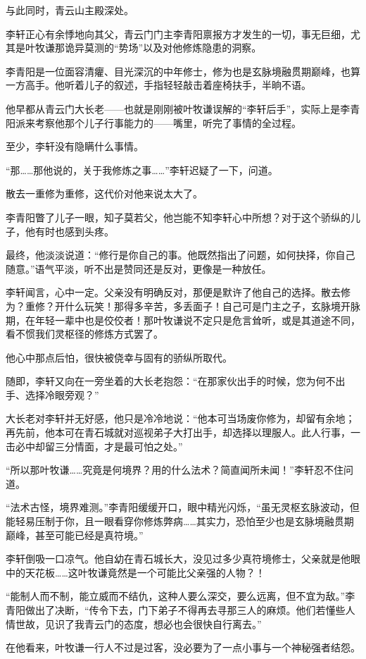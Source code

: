 与此同时，青云山主殿深处。

李轩正心有余悸地向其父，青云门门主李青阳禀报方才发生的一切，事无巨细，尤其是叶牧谦那诡异莫测的“势场”以及对他修炼隐患的洞察。

李青阳是一位面容清癯、目光深沉的中年修士，修为也是玄脉境融贯期巅峰，也算一方高手。他听着儿子的叙述，手指轻轻敲击着座椅扶手，半晌不语。

他早都从青云门大长老——也就是刚刚被叶牧谦误解的“李轩后手”，实际上是李青阳派来考察他那个儿子行事能力的——嘴里，听完了事情的全过程。

至少，李轩没有隐瞒什么事情。

“那……那他说的，关于我修炼之事……”李轩迟疑了一下，问道。

散去一重修为重修，这代价对他来说太大了。

李青阳瞥了儿子一眼，知子莫若父，他岂能不知李轩心中所想？对于这个骄纵的儿子，他有时也感到头疼。

最终，他淡淡说道：“修行是你自己的事。他既然指出了问题，如何抉择，你自己随意。”语气平淡，听不出是赞同还是反对，更像是一种放任。

李轩闻言，心中一定。父亲没有明确反对，那便是默许了他自己的选择。散去修为？重修？开什么玩笑！那得多辛苦，多丢面子！自己可是门主之子，玄脉境开脉期，在年轻一辈中也是佼佼者！那叶牧谦说不定只是危言耸听，或是其道途不同，看不惯我们灵枢径的修炼方式罢了。

他心中那点后怕，很快被侥幸与固有的骄纵所取代。

随即，李轩又向在一旁坐着的大长老抱怨：“在那家伙出手的时候，您为何不出手、选择冷眼旁观？”

大长老对李轩并无好感，他只是冷冷地说：“他本可当场废你修为，却留有余地；再先前，他本可在青石城就对巡视弟子大打出手，却选择以理服人。此人行事，一击必中却留三分情面，才是最可怕之处。”

“所以那叶牧谦……究竟是何境界？用的什么法术？简直闻所未闻！”李轩忍不住问道。

“法术古怪，境界难测。”李青阳缓缓开口，眼中精光闪烁，“虽无灵枢玄脉波动，但能轻易压制于你，且一眼看穿你修炼弊病……其实力，恐怕至少也是玄脉境融贯期巅峰，甚至可能已经是真符境。”

李轩倒吸一口凉气。他自幼在青石城长大，没见过多少真符境修士，父亲就是他眼中的天花板……这叶牧谦竟然是一个可能比父亲强的人物？！

“能制人而不制，能立威而不结仇，这种人要么深交，要么远离，但不宜为敌。”李青阳做出了决断，“传令下去，门下弟子不得再去寻那三人的麻烦。他们若懂些人情世故，见识了我青云门的态度，想必也会很快自行离去。”

在他看来，叶牧谦一行人不过是过客，没必要为了一点小事与一个神秘强者结怨。

